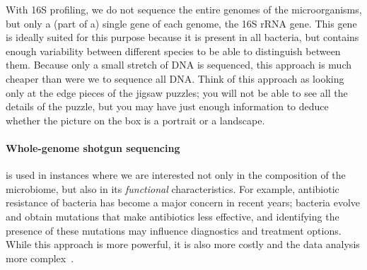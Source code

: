 \begin{justify}
With 16S profiling, we do not sequence the entire genomes of the microorganisms, but only a (part of a) single gene of each genome, the 16S rRNA gene. This gene is ideally suited for this purpose because it is present in all bacteria, but contains enough variability between different species to be able to distinguish between them. Because only a small stretch of DNA is sequenced, this approach is much cheaper than were we to sequence all DNA\@. Think of this approach as looking only at the edge pieces of the jigsaw puzzles; you will not be able to see all the details of the puzzle, but you may have just enough information to deduce whether the picture on the box is a portrait or a landscape.


\paragraph{Whole-genome shotgun sequencing} is used in instances where we are interested not only in the composition of the microbiome, but also in its \emph{functional} characteristics. For example, antibiotic resistance of bacteria has become a major concern in recent years; bacteria evolve and obtain mutations that make antibiotics less effective, and identifying the presence of these mutations may influence diagnostics and treatment options. While this approach is more powerful, it is also more costly and the data analysis more complex~\cite{ranjan2016analysis}.


\end{justify}
